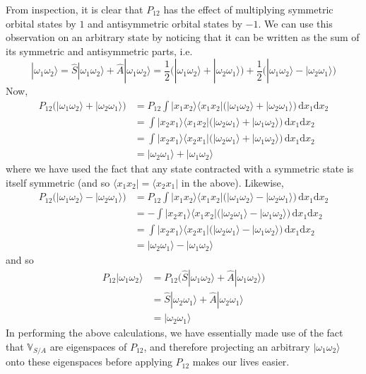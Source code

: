 \documentclass[../principles-of-quantum-mechanics.tex]{subfiles}
\begin{document}
\begin{questions}
\begin{solution}
			From inspection, it is clear that $P_{12}$ has the effect of multiplying symmetric orbital states by $1$ and antisymmetric orbital states by $-1$. We can use this observation on an arbitrary state by noticing that it can be written as the sum of its symmetric and antisymmetric parts, i.e.
			$$|\omega_1\omega_2\rangle = \hat{S}|\omega_1\omega_2\rangle + \hat{A}|\omega_1\omega_2\rangle = \frac{1}{2}\Big(|\omega_1\omega_2\rangle + |\omega_2\omega_1\rangle\Big) + \frac{1}{2}\Big(|\omega_1\omega_2\rangle - |\omega_2\omega_1\rangle\Big)$$
			Now,
			\begin{align*}
				P_{12}\Big(|\omega_1\omega_2\rangle + |\omega_2\omega_1\rangle\Big) &= P_{12}\int|x_1x_2\rangle\langle x_1x_2|\Big(|\omega_1\omega_2\rangle + |\omega_2\omega_1\rangle\Big)\,\mathrm{d}x_1\mathrm{d}x_2 \\
				&= \int|x_2x_1\rangle\langle x_1x_2|\Big(|\omega_2\omega_1\rangle + |\omega_1\omega_2\rangle\Big)\,\mathrm{d}x_1\mathrm{d}x_2 \\
				&= \int|x_2x_1\rangle\langle x_2x_1|\Big(|\omega_2\omega_1\rangle + |\omega_1\omega_2\rangle\Big)\,\mathrm{d}x_1\mathrm{d}x_2 \\
				&= |\omega_2\omega_1\rangle + |\omega_1\omega_2\rangle
			\end{align*}
			where we have used the fact that any state contracted with a symmetric state is itself symmetric (and so $\langle x_1x_2| = \langle x_2x_1|$ in the above). Likewise,
			\begin{align*}
				P_{12}\Big(|\omega_1\omega_2\rangle - |\omega_2\omega_1\rangle\Big) &= P_{12}\int|x_1x_2\rangle\langle x_1x_2|\Big(|\omega_1\omega_2\rangle - |\omega_2\omega_1\rangle\Big)\,\mathrm{d}x_1\mathrm{d}x_2 \\
				&= -\int|x_2x_1\rangle\langle x_1x_2|\Big(|\omega_2\omega_1\rangle - |\omega_1\omega_2\rangle\Big)\,\mathrm{d}x_1\mathrm{d}x_2 \\
				&= \int|x_2x_1\rangle\langle x_2x_1|\Big(|\omega_2\omega_1\rangle - |\omega_1\omega_2\rangle\Big)\,\mathrm{d}x_1\mathrm{d}x_2 \\
				&= |\omega_2\omega_1\rangle - |\omega_1\omega_2\rangle
			\end{align*}
			and so
			\begin{align*}
				P_{12}|\omega_1\omega_2\rangle &= P_{12}\Big(\hat{S}|\omega_1\omega_2\rangle + \hat{A}|\omega_1\omega_2\rangle\Big) \\
				&= \hat{S}|\omega_2\omega_1\rangle + \hat{A}|\omega_2\omega_1\rangle \\
				&= |\omega_2\omega_1\rangle
			\end{align*}
			In performing the above calculations, we have essentially made use of the fact that $\mathbb{V}_{S/A}$ are eigenspaces of $P_{12}$, and therefore projecting an arbitrary $|\omega_1\omega_2\rangle$ onto these eigenspaces before applying $P_{12}$ makes our lives easier.
			

\end{solution}
\end{questions}
\end{document}
